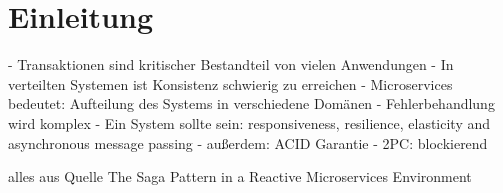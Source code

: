 \chapter{Einleitung}

- Transaktionen sind kritischer Bestandteil von vielen Anwendungen
- In verteilten Systemen ist Konsistenz schwierig zu erreichen
- Microservices bedeutet: Aufteilung des Systems in verschiedene Domänen
- Fehlerbehandlung wird komplex
- Ein System sollte sein: responsiveness, resilience, elasticity and asynchronous message passing
- außerdem: ACID Garantie
- 2PC: blockierend

alles aus Quelle The Saga Pattern in a Reactive Microservices Environment
